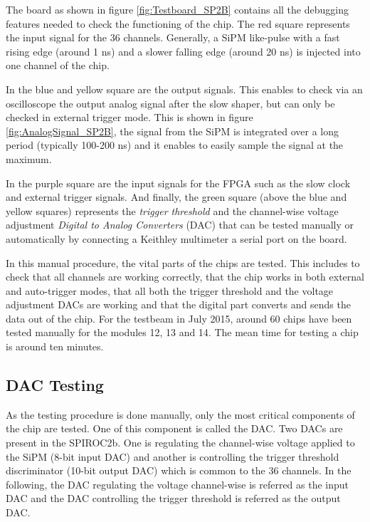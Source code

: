 The board as shown in figure \ref{fig:Testboard_SP2B} contains all the debugging features needed to check the functioning of the chip. The red square represents the input signal for the 36 channels. Generally, a SiPM like-pulse with a fast rising edge (around 1 ns) and a slower falling edge (around 20 ns) is injected into one channel of the chip.

In the blue and yellow square are the output signals. This enables to check via an oscilloscope the output analog signal after the slow shaper, but can only be checked in external trigger mode. This is shown in figure \ref{fig:AnalogSignal_SP2B}, the signal from the SiPM is integrated over a long period (typically 100-200 ns) and it enables to easily sample the signal at the maximum.

In the purple square are the input signals for the FPGA such as the slow clock and external trigger signals. And finally, the green square (above the blue and yellow squares) represents the \textit{trigger threshold} and the channel-wise voltage adjustment \textit{Digital to Analog Converters} (DAC) that can be tested manually or automatically by connecting a Keithley multimeter a serial port on the board.

In this manual procedure, the vital parts of the chips are tested. This includes to check that all channels are working correctly, that the chip works in both external and auto-trigger modes, that all both the trigger threshold and the voltage adjustment DACs are working and that the digital part converts and sends the data out of the chip. For the testbeam in July 2015, around 60 chips have been tested manually for the modules 12, 13 and 14. The mean time for testing a chip is around ten minutes.

\subsection{DAC Testing}
\label{sec:DACTesting}

As the testing procedure is done manually, only the most critical components of the chip are tested. One of this component is called the DAC. Two DACs are present in the SPIROC2b. One is regulating the channel-wise voltage applied to the SiPM (8-bit input DAC) and another is controlling the trigger threshold discriminator (10-bit output DAC) which is common to the 36 channels. In the following, the DAC regulating the voltage channel-wise is referred as the input DAC and the DAC controlling the trigger threshold is referred as the output DAC.

